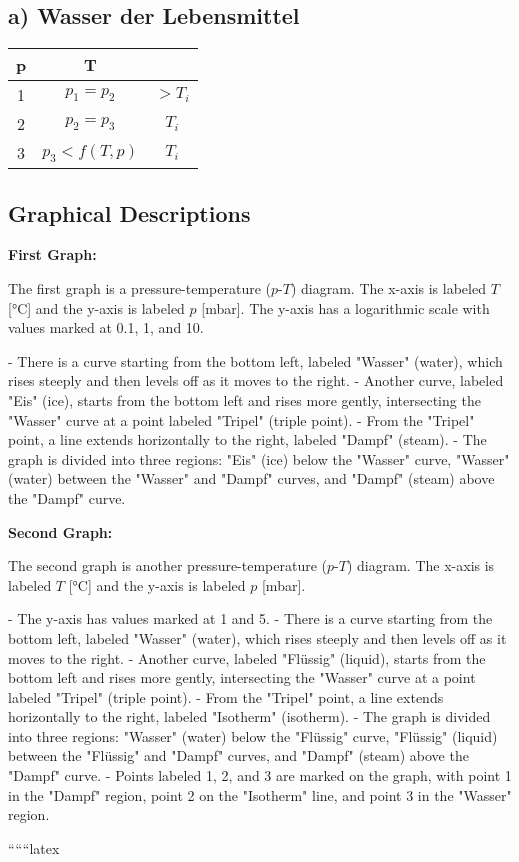 \subsection*{a) Wasser der Lebensmittel}

\begin{tabular}{|c|c|c|}
\hline
p & T & \\
\hline
1 & $p_1 = p_2$ & $> T_i$ \\
2 & $p_2 = p_3$ & $T_i$ \\
3 & $p_3 < f(T,p)$ & $T_i$ \\
\hline
\end{tabular}

\subsection*{Graphical Descriptions}

\textbf{First Graph:}

The first graph is a pressure-temperature ($p$-$T$) diagram. The x-axis is labeled $T$ [°C] and the y-axis is labeled $p$ [mbar]. The y-axis has a logarithmic scale with values marked at 0.1, 1, and 10. 

- There is a curve starting from the bottom left, labeled "Wasser" (water), which rises steeply and then levels off as it moves to the right.
- Another curve, labeled "Eis" (ice), starts from the bottom left and rises more gently, intersecting the "Wasser" curve at a point labeled "Tripel" (triple point).
- From the "Tripel" point, a line extends horizontally to the right, labeled "Dampf" (steam).
- The graph is divided into three regions: "Eis" (ice) below the "Wasser" curve, "Wasser" (water) between the "Wasser" and "Dampf" curves, and "Dampf" (steam) above the "Dampf" curve.

\textbf{Second Graph:}

The second graph is another pressure-temperature ($p$-$T$) diagram. The x-axis is labeled $T$ [°C] and the y-axis is labeled $p$ [mbar]. 

- The y-axis has values marked at 1 and 5.
- There is a curve starting from the bottom left, labeled "Wasser" (water), which rises steeply and then levels off as it moves to the right.
- Another curve, labeled "Flüssig" (liquid), starts from the bottom left and rises more gently, intersecting the "Wasser" curve at a point labeled "Tripel" (triple point).
- From the "Tripel" point, a line extends horizontally to the right, labeled "Isotherm" (isotherm).
- The graph is divided into three regions: "Wasser" (water) below the "Flüssig" curve, "Flüssig" (liquid) between the "Flüssig" and "Dampf" curves, and "Dampf" (steam) above the "Dampf" curve.
- Points labeled 1, 2, and 3 are marked on the graph, with point 1 in the "Dampf" region, point 2 on the "Isotherm" line, and point 3 in the "Wasser" region.

``````latex